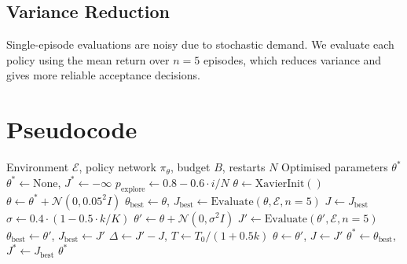 \documentclass[11pt,a4paper]{article}
\begin{document}
\subsection{Variance Reduction}

Single-episode evaluations are noisy due to stochastic demand. We evaluate each policy using the mean return over $n = 5$ episodes, which reduces variance and gives more reliable acceptance decisions.

\section{Pseudocode}

\begin{algorithm}[H]
\caption{Multi-Restart Simulated Annealing for Policy Optimisation}
\begin{algorithmic}[1]
\Require Environment $\mathcal{E}$, policy network $\pi_\theta$, budget $B$, restarts $N$
\Ensure Optimised parameters $\theta^*$
\State $\theta^* \gets \text{None}$, $J^* \gets -\infty$
    \State $p_{\text{explore}} \gets 0.8 - 0.6 \cdot i/N$
        \State $\theta \gets \text{XavierInit}()$ 
    \Else
        \State $\theta \gets \theta^* + \mathcal{N}(0, 0.05^2 I)$ 
    \EndIf
    \State $\theta_{\text{best}} \gets \theta$, $J_{\text{best}} \gets \text{Evaluate}(\theta, \mathcal{E}, n=5)$
    \State $J \gets J_{\text{best}}$ 
     
        \State $\sigma \gets 0.4 \cdot (1 - 0.5 \cdot k/K)$ 
        \State $\theta' \gets \theta + \mathcal{N}(0, \sigma^2 I)$
        \State $J' \gets \text{Evaluate}(\theta', \mathcal{E}, n=5)$
            \State $\theta_{\text{best}} \gets \theta'$, $J_{\text{best}} \gets J'$
        \EndIf
        \State $\Delta \gets J' - J$, $T \gets T_0 / (1 + 0.5k)$
            \State $\theta \gets \theta'$, $J \gets J'$ 
        \EndIf
    \EndFor
        \State $\theta^* \gets \theta_{\text{best}}$, $J^* \gets J_{\text{best}}$
    \EndIf
\EndFor
\State \Return $\theta^*$
\end{algorithmic}
\end{algorithm}
\end{document}
